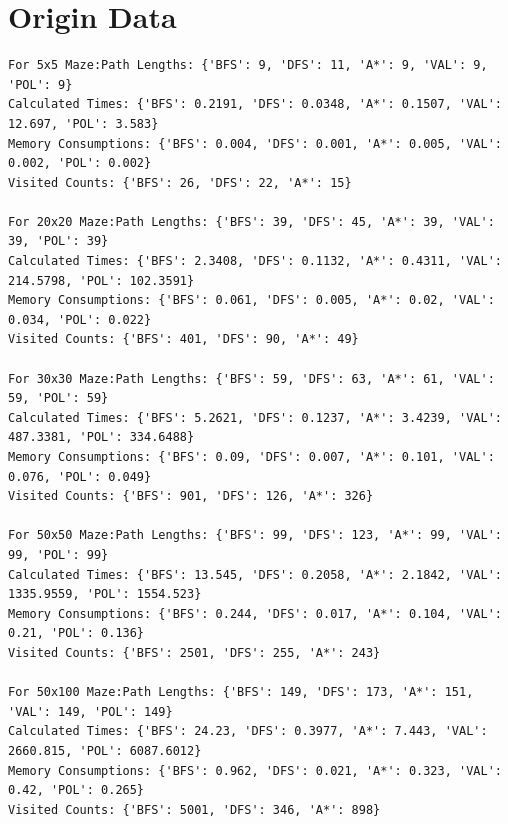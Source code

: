 \documentclass{article}
\begin{document}
\section{Origin Data}
\begin{verbatim}
For 5x5 Maze:Path Lengths: {'BFS': 9, 'DFS': 11, 'A*': 9, 'VAL': 9, 'POL': 9}
Calculated Times: {'BFS': 0.2191, 'DFS': 0.0348, 'A*': 0.1507, 'VAL': 12.697, 'POL': 3.583}
Memory Consumptions: {'BFS': 0.004, 'DFS': 0.001, 'A*': 0.005, 'VAL': 0.002, 'POL': 0.002}
Visited Counts: {'BFS': 26, 'DFS': 22, 'A*': 15}

For 20x20 Maze:Path Lengths: {'BFS': 39, 'DFS': 45, 'A*': 39, 'VAL': 39, 'POL': 39}
Calculated Times: {'BFS': 2.3408, 'DFS': 0.1132, 'A*': 0.4311, 'VAL': 214.5798, 'POL': 102.3591}
Memory Consumptions: {'BFS': 0.061, 'DFS': 0.005, 'A*': 0.02, 'VAL': 0.034, 'POL': 0.022}
Visited Counts: {'BFS': 401, 'DFS': 90, 'A*': 49}

For 30x30 Maze:Path Lengths: {'BFS': 59, 'DFS': 63, 'A*': 61, 'VAL': 59, 'POL': 59}
Calculated Times: {'BFS': 5.2621, 'DFS': 0.1237, 'A*': 3.4239, 'VAL': 487.3381, 'POL': 334.6488}
Memory Consumptions: {'BFS': 0.09, 'DFS': 0.007, 'A*': 0.101, 'VAL': 0.076, 'POL': 0.049}
Visited Counts: {'BFS': 901, 'DFS': 126, 'A*': 326}

For 50x50 Maze:Path Lengths: {'BFS': 99, 'DFS': 123, 'A*': 99, 'VAL': 99, 'POL': 99}
Calculated Times: {'BFS': 13.545, 'DFS': 0.2058, 'A*': 2.1842, 'VAL': 1335.9559, 'POL': 1554.523}
Memory Consumptions: {'BFS': 0.244, 'DFS': 0.017, 'A*': 0.104, 'VAL': 0.21, 'POL': 0.136}
Visited Counts: {'BFS': 2501, 'DFS': 255, 'A*': 243}

For 50x100 Maze:Path Lengths: {'BFS': 149, 'DFS': 173, 'A*': 151, 'VAL': 149, 'POL': 149}
Calculated Times: {'BFS': 24.23, 'DFS': 0.3977, 'A*': 7.443, 'VAL': 2660.815, 'POL': 6087.6012}
Memory Consumptions: {'BFS': 0.962, 'DFS': 0.021, 'A*': 0.323, 'VAL': 0.42, 'POL': 0.265}
Visited Counts: {'BFS': 5001, 'DFS': 346, 'A*': 898}
\end{verbatim}
\end{document}

